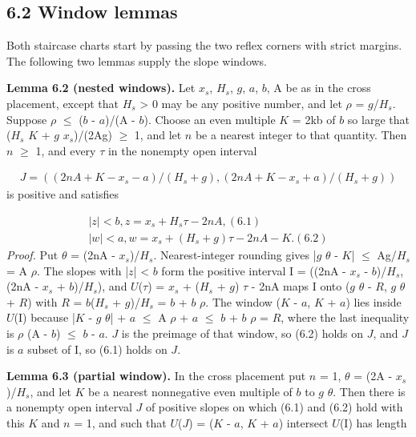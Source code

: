 \documentclass[11pt]{article}
\begin{document}
\subsection*{6.2 Window lemmas}
Both staircase charts start by passing the two reflex corners with strict margins. The following two lemmas supply the slope windows.

\textbf{Lemma 6.2 (nested windows).} Let \(x_{s}\), \(H_{s}\), \(g\), \(a\), \(b\), A be as in the cross placement, except that \(H_{s}\) > 0 may be any positive number, and let \(\rho\) = \(g\)/\(H_{s}\). Suppose \(\rho\) \(\le\) (\(b\) - \(a\))/(A - \(b\)). Choose an even multiple \(K\) = 2kb of \(b\) so large that (\(H_{s}\) \(K\) + \(g\) \(x_{s}\))/(2Ag) \(\ge\) 1, and let \(n\) be a nearest integer to that quantity. Then \(n\) \(\ge\) 1, and every \(\tau\) in the nonempty open interval

\begin{gather*}
J = ((2nA + K - x_{s} - a)/(H_{s} + g), (2nA + K - x_{s} + a)/(H_{s} + g))
\end{gather*}
is positive and satisfies

\begin{gather*}
|z| < b,   z = x_{s} + H_{s} \tau - 2nA,                                (6.1) \\
|w| < a,   w = x_{s} + (H_{s} + g) \tau - 2nA - K.                      (6.2)
\end{gather*}
\emph{Proof.} Put \(\theta\) = (2nA - \(x_{s}\))/\(H_{s}\). Nearest-integer rounding gives |\(g\) \(\theta\) - \(K\)| \(\le\) Ag/\(H_{s}\) = A \(\rho\). The slopes with |\(z\)| < \(b\) form the positive interval I = ((2nA - \(x_{s}\) - \(b\))/\(H_{s}\), (2nA - \(x_{s}\) + \(b\))/\(H_{s}\)), and \(U\)(\(\tau\)) = \(x_{s}\) + (\(H_{s}\) + \(g\)) \(\tau\) - 2nA maps I onto (\(g\) \(\theta\) - \(R\), \(g\) \(\theta\) + \(R\)) with \(R\) = \(b\)(\(H_{s}\) + \(g\))/\(H_{s}\) = \(b\) + \(b\) \(\rho\). The window (\(K\) - \(a\), \(K\) + \(a\)) lies inside \(U\)(I) because |\(K\) - \(g\) \(\theta\)| + \(a\) \(\le\) A \(\rho\) + \(a\) \(\le\) \(b\) + \(b\) \(\rho\) = \(R\), where the last inequality is \(\rho\) (A - \(b\)) \(\le\) \(b\) - \(a\). \(J\) is the preimage of that window, so (6.2) holds on \(J\), and \(J\) is \(a\) subset of I, so (6.1) holds on \(J\).

\textbf{Lemma 6.3 (partial window).} In the cross placement put \(n\) = 1, \(\theta\) = (2A - \(x_{s}\))/\(H_{s}\), and let \(K\) be a nearest nonnegative even multiple of \(b\) to \(g\) \(\theta\). Then there is a nonempty open interval \(J\) of positive slopes on which (6.1) and (6.2) hold with this \(K\) and \(n\) = 1, and such that \(U\)(\(J\)) = (\(K\) - \(a\), \(K\) + \(a\)) intersect \(U\)(I) has length
\end{document}
